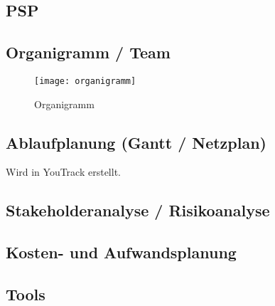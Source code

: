 \subsection{PSP}\label{subsec:PSP}

\subsection{Organigramm / Team}\label{subsec:Organigramm}

\begin{figure}[htbp]
    \centering
    \texttt{[image: organigramm]}
    \caption{Organigramm}
\end{figure}

\subsection{Ablaufplanung (Gantt / Netzplan)}\label{subsec:Ablaufplan}
Wird in YouTrack erstellt.

\subsection{Stakeholderanalyse / Risikoanalyse}\label{subsec:Stakeholder-Risikoanalyse}

\subsection{Kosten- und Aufwandsplanung}\label{subsec:Kosten-Aufwandsplanung}

\subsection{Tools}\label{subsec:Tools}

